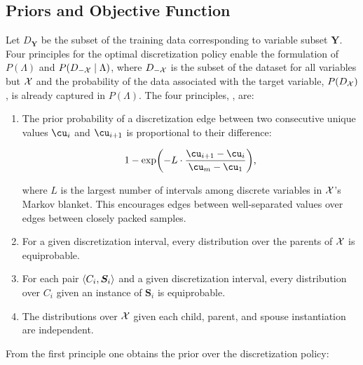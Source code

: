 

\subsection{Priors and Objective Function}

Let $D_{\bm{Y}}$ be the subset of the training data corresponding to variable subset $\bm{Y}$.
Four principles for the optimal discretization policy enable the formulation of $P(\Lambda)$ and $P(D_{-\mathcal{X}} \mid \Lambda)$, where $D_{-\mathcal{X}}$ is the subset of the dataset for all variables but $\mathcal{X}$ and the probability of the data associated with the target variable, $P(D_{\mathcal{X}})$, is already captured in $P(\Lambda)$.
The four principles, , are:

\begin{enumerate}
\item The prior probability of a discretization edge between two consecutive unique values $\cu_i$ and $\cu_{i+1}$ is proportional to their difference:

  \begin{equation}
  1 - \exp \paren{- L \cdot \frac{\cu_{i+1} - \cu_i}{\cu_m - \cu_1}}\text{,}
  \end{equation}

where $L$ is the largest number of intervals among discrete variables in $\mathcal{X}$'s Markov blanket.
This encourages edges between well-separated values over edges between closely packed samples.

\item For a given discretization interval, every distribution over the parents of $\mathcal{X}$ is equiprobable.
\item For each pair $\langle C_i,\bm{S}_i \rangle$ and a given discretization interval, every distribution over $C_i$ given an instance of $\bm{S}_i$ is equiprobable.
\item The distributions over $\mathcal{X}$ given each child, parent, and spouse instantiation are independent.
\end{enumerate}

From the first principle one obtains the prior over the discretization policy:


